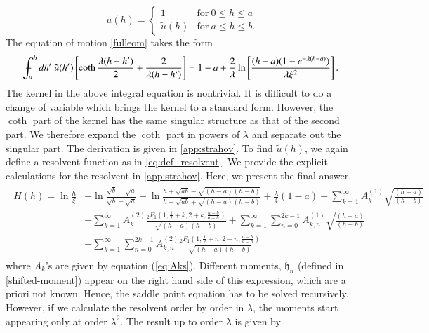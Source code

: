 \documentclass[3p,12pt]{elsarticle}
\numberwithin{equation}{section}
\begin{document}
\begin{equation}
\label{eq:u_ansatz}
u(h)=
\begin{cases}
1 &\mbox{for}\ 0\leq h\leq a \\
\tilde{u}(h) &\mbox{for}\  a\leq h\leq b.
\end{cases}
\end{equation}
The equation of motion \eqref{fulleom} takes the form
\begin{equation}
\label{eom2}
\Xint-_{a}^{b} dh'\ \tilde{u}(h')\left[\coth \frac{\lambda(h-h')}{2}+\frac{2}{\lambda(h-h')}\right]=1-a+\frac{2}{\lambda}\ln \left[\frac{(h-a)(1-e^{-\lambda (h-a)})}{\lambda \xi^2}\right].
\end{equation}
The kernel in the above integral equation is nontrivial. It is difficult to do a change of variable which brings the kernel to a standard form. However, the $\coth$ part of the kernel has the same singular structure as that of the second part. We therefore expand the $\coth$ part in powers of $\lambda$ and separate out the singular part. The derivation is given in \ref{app:strahov}. To find $\tilde{u}(h)$, we again define a resolvent function as in \eqref{eq:def_resolvent}. We provide the explicit calculations for the resolvent in \ref{app:strahov}. Here, we present the final answer.
%
\begin{eqnarray} 
\label{resolvent-exact}
\begin{split}
 H(h) = \ln \frac{h}{\xi} & + \ln \frac{\sqrt{b}-\sqrt{a}}{\sqrt{b}+\sqrt{a}}+\ln \frac{h + \sqrt{a b} - \sqrt{(h-a)(h-b)}}{h-\sqrt{a b} + \sqrt{(h-a)(h-b)}} + \frac{\lambda}{4}(1-a)+\sum_{k=1}^{\infty} A_{k}^{(1)}\sqrt{\frac{(h-a)}{(h-b)}} \\ & + \sum_{k=1}^{\infty}A_{k}^{(2)}\frac{_2F_1(1,\frac{1}{2}+k,2+k,\frac{a-b}{a-h})}{\sqrt{(h-a)(h-b)}}+\sum_{k=1}^{\infty}\sum_{n=0}^{2k-1}A_{k,n}^{(1)}\sqrt{\frac{(h-a)}{(h-b)}} \\ & + \sum_{k=1}^{\infty}\sum_{n=0}^{2k-1}A_{k,n}^{(2)}\frac{_2F_1(1,\frac{1}{2}+n,2+n,\frac{a-b}{a-h})}{\sqrt{(h-a)(h-b)}}       
\end{split}
\end{eqnarray}
%
where $A_k$'s are given by equation (\ref{eq:Aks}). Different moments, $\mathfrak{h}_n$ (defined in \eqref{shifted-moment}) appear on the right hand side of this expression, which are a priori not known. Hence, the saddle point equation has to be solved recursively. However, if we calculate the resolvent order by order in $\lambda$, the moments start appearing only at order $\lambda^2$. The result up to order $\lambda$ is given by
\end{document}
